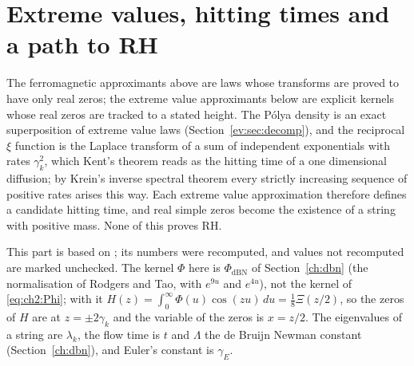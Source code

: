 \chapter{Extreme values, hitting times and a path to RH}\label{chap:evt}\label{ch:evt}

The ferromagnetic approximants above are laws whose transforms are proved to have only real zeros; the extreme value approximants below are explicit kernels whose real zeros are tracked to a stated height. The P\'olya density is an exact superposition of extreme value laws (Section~\ref{ev:sec:decomp}), and the reciprocal $\xi$ function is the Laplace transform of a sum of independent exponentials with rates $\gamma_k^2$, which Kent's theorem reads as the hitting time of a one dimensional diffusion; by Krein's inverse spectral theorem every strictly increasing sequence of positive rates arises this way. Each extreme value approximation therefore defines a candidate hitting time, and real simple zeros become the existence of a string with positive mass. None of this proves RH.

This part is based on \cite{P26evt}; its numbers were recomputed, and values not recomputed are marked unchecked. The kernel $\Phi$ here is $\Phi_{\mathrm{dBN}}$ of Section~\ref{ch:dbn} (the normalisation of Rodgers and Tao, with $e^{9u}$ and $e^{4u}$), not the kernel of \eqref{eq:ch2:Phi}; with it $H(z)=\int_0^\infty\Phi(u)\cos(zu)\,du=\tfrac18\Xi(z/2)$, so the zeros of $H$ are at $z=\pm2\gamma_k$ and the variable of the zeros is $x=z/2$. The eigenvalues of a string are $\lambda_k$, the flow time is $t$ and $\Lambda$ the de Bruijn Newman constant (Section~\ref{ch:dbn}), and Euler's constant is $\gamma_E$.

